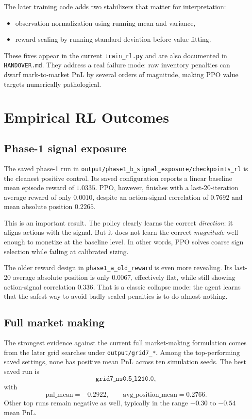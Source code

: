 \documentclass[11pt]{article}
\begin{document}
The later training code adds two stabilizers that matter for interpretation:
\begin{itemize}
\item observation normalization using running mean and variance,
\item reward scaling by running standard deviation before value fitting.
\end{itemize}
These fixes appear in the current \texttt{train\_rl.py} and are also documented in \texttt{HANDOVER.md}. They address a real failure mode: raw inventory penalties can dwarf mark-to-market PnL by several orders of magnitude, making PPO value targets numerically pathological.

\section{Empirical RL Outcomes}
\subsection{Phase-1 signal exposure}
The saved phase-1 run in \texttt{output/phase1\_b\_signal\_exposure/checkpoints\_rl} is the cleanest positive control. Its saved configuration reports a linear baseline mean episode reward of \(1.0335\). PPO, however, finishes with a last-20-iteration average reward of only \(0.0010\), despite an action-signal correlation of \(0.7692\) and mean absolute position \(0.2265\).

This is an important result. The policy clearly learns the correct \emph{direction}: it aligns actions with the signal. But it does not learn the correct \emph{magnitude} well enough to monetize at the baseline level. In other words, PPO solves coarse sign selection while failing at calibrated sizing.

The older reward design in \texttt{phase1\_a\_old\_reward} is even more revealing. Its last-20 average absolute position is only \(0.0067\), effectively flat, while still showing action-signal correlation \(0.336\). That is a classic collapse mode: the agent learns that the safest way to avoid badly scaled penalties is to do almost nothing.

\subsection{Full market making}
The strongest evidence against the current full market-making formulation comes from the later grid searches under \texttt{output/grid7\_*}. Among the top-performing saved settings, none has positive mean PnL across ten simulation seeds. The best saved run is
\[
\texttt{grid7\_ns0.5\_l210.0},
\]
with
\[
\mathrm{pnl\_mean} = -0.2922, \qquad
\mathrm{avg\_position\_mean} = 0.2766.
\]
Other top runs remain negative as well, typically in the range \(-0.30\) to \(-0.54\) mean PnL.
\end{document}
